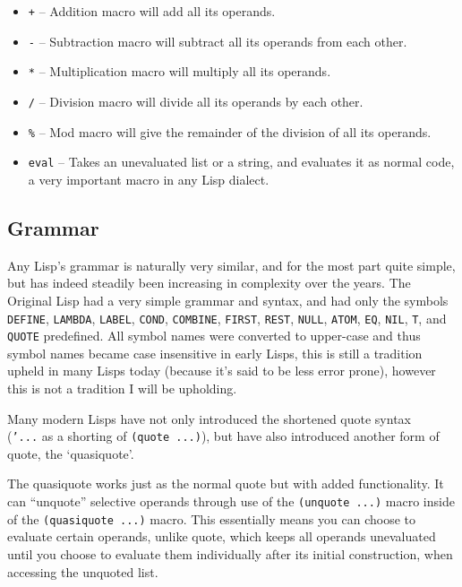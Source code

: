 \documentclass{article}
\newcommand{\code}[1]{\texttt{#1}}
\begin{document}
\begin{itemize}
        \item \code{+} -- Addition macro will add all its operands.
        \item \code{-} -- Subtraction macro will subtract all its operands from each other.
        \item \code{*} -- Multiplication macro will multiply all its operands.
        \item \code{/} -- Division macro will divide all its operands  by each other.
        \item \code{\%} -- Mod macro will give the remainder of the division of
                           all its operands.

        \item \code{eval} -- Takes an unevaluated list or a string, and evaluates
                             it as normal code, a very important macro in any
                             Lisp dialect.
      \end{itemize}




  \subsection{Grammar}
    Any Lisp's grammar is naturally very similar, and for the most part quite
    simple, but has indeed steadily been increasing in complexity over the years.
    The Original Lisp had a very simple grammar and syntax, and had only the
    symbols \code{DEFINE}, \code{LAMBDA}, \code{LABEL}, \code{COND},
    \code{COMBINE}, \code{FIRST}, \code{REST}, \code{NULL}, \code{ATOM},
    \code{EQ}, \code{NIL}, \code{T}, and \code{QUOTE} predefined\autocite{sexp}.
    All symbol names were converted to upper-case and thus
    symbol names became case insensitive in early Lisps, this is
    still a tradition upheld in many Lisps today (because it's said to be less
    error prone), however this is not a tradition I will be upholding.

    Many modern Lisps have not only introduced the shortened quote syntax\\
    (\code{'...} as a shorting of \code{(quote ...)}), but have also introduced
    another form of quote, the `quasiquote'.

    The quasiquote works just as the normal quote but with added functionality.
    It can ``unquote'' selective operands through use of the \code{(unquote ...)}
    macro inside of the \code{(quasiquote ...)} macro. This essentially means
    you can choose to evaluate certain operands, unlike quote, which keeps all
    operands unevaluated until you choose to evaluate them individually after
    its initial construction, when accessing the unquoted list.
\end{document}
